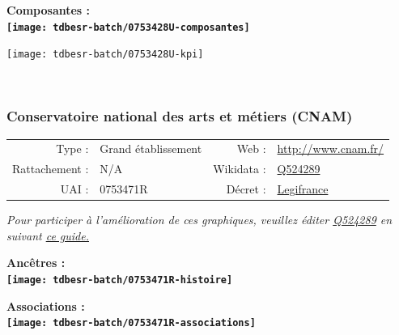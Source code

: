\documentclass[12pt,french,]{article}
\begin{document}
\begin{center} \bf Composantes : \\  
\texttt{[image: tdbesr-batch/0753428U-composantes]} \end{center}

\begin{center}\texttt{[image: tdbesr-batch/0753428U-kpi]} \end{center}\checkoddpage

\ifoddpage ~\newpage \fi   

\hypertarget{conservatoire-national-des-arts-et-muxe9tiers-cnam}{%
\subsubsection{Conservatoire national des arts et métiers
(CNAM)}\label{conservatoire-national-des-arts-et-muxe9tiers-cnam}}

\begin{tabular*}{\textwidth}{rp{5cm}rl}  
\hline  
Type : & Grand établissement & Web : &\href{http://www.cnam.fr/}{http://www.cnam.fr/} \\  
Rattachement : & N/A & Wikidata : & \href{https://www.wikidata.org/entity/Q524289}{Q524289} \\  
UAI : & 0753471R & Décret : & \href{http://www.legifrance.gouv.fr/affichTexte.do?dateTexte=&categorieLien=id&cidTexte=JORFTEXT000021292171&fastPos=1&fastReqId=2018633024&oldAction=rechExpTexteJorf}{Legifrance} \\  
\hline  
\end{tabular*}

\textit{\scriptsize Pour participer à l'amélioration de ces graphiques, veuillez éditer  \href{https://www.wikidata.org/entity/Q524289}{Q524289}  en suivant \href{https://github.com/cpesr/wikidataESR/blob/master/Rmd/wikidataESR.md}{ce guide.}}

\vspace{1cm}  
\begin{minipage}[b]{0.50\textwidth}\begin{center} \bf Ancêtres : \\  
\texttt{[image: tdbesr-batch/0753471R-histoire]} \end{center}\end{minipage}\begin{minipage}[b]{0.50\textwidth}\begin{center} \bf Associations : \\  
\texttt{[image: tdbesr-batch/0753471R-associations]} \end{center}\end{minipage}
\end{document}
